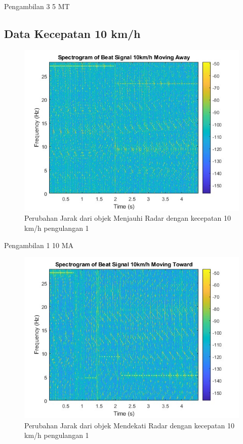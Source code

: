 Pengambilan 3 5 MT

\subsection{Data Kecepatan 10 km/h}

\begin{figure}
	\centering
	\includegraphics[scale=0.6]{pics/bab5/Velocity/1_10MA.jpg}
	\caption{Perubahan Jarak dari objek Menjauhi Radar dengan kecepatan 10 km/h pengulangan 1}
	\label{fig:pengambilan1_10MA}
\end{figure}

Pengambilan 1 10 MA

\begin{figure}
	\centering
	\includegraphics[scale=0.6]{pics/bab5/Velocity/1_10MT.jpg}
	\caption{Perubahan Jarak dari objek Mendekati Radar dengan kecepatan 10 km/h pengulangan 1}
	\label{fig:pengambilan1_10MT}
\end{figure}

